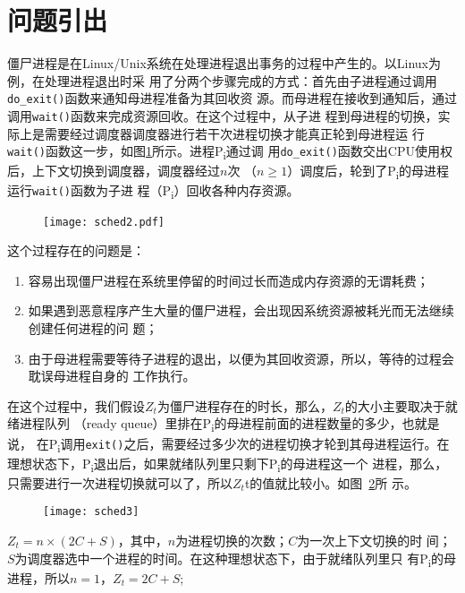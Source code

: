 \documentclass{swfuthesism}
\begin{document}
\section{问题引出}

僵尸进程是在Linux/Unix系统在处理进程退出事务的过程中产生的。以Linux为例，在处理进程退出时采
用了分两个步骤完成的方式：首先由子进程通过调用\texttt{do\_exit()}函数来通知母进程准备为其回收资
源。而母进程在接收到通知后，通过调用\texttt{wait()}函数来完成资源回收。在这个过程中，从子进
程到母进程的切换，实际上是需要经过调度器调度器进行若干次进程切换才能真正轮到母进程运
行\texttt{wait()}函数这一步，如图\ref{fig:sched2}所示。进程P\textsubscript{i}通过调
用\texttt{do\_exit()}函数交出CPU使用权后，上下文切换到调度器，调度器经过$n$次
（$n\ge 1$）调度后，轮到了P\textsubscript{i}的母进程运行\texttt{\texttt{wait()}}函数为子进
程（P\textsubscript{i}）回收各种内存资源。

\begin{figure}
  \centering
  \texttt{[image: sched2.pdf]}
  \label{fig:sched2}
\end{figure}

这个过程存在的问题是：
\begin{enumerate}
\item 容易出现僵尸进程在系统里停留的时间过长而造成内存资源的无谓耗费；
\item 如果遇到恶意程序产生大量的僵尸进程，会出现因系统资源被耗光而无法继续创建任何进程的问
  题；
\item 由于母进程需要等待子进程的退出，以便为其回收资源，所以，等待的过程会耽误母进程自身的
  工作执行。
\end{enumerate}

在这个过程中，我们假设$Z_t$为僵尸进程存在的时长，那么，$Z_t$的大小主要取决于就绪进程队列
（ready queue）里排在P\textsubscript{i}的母进程前面的进程数量的多少，也就是说，
在P\textsubscript{i}调用\texttt{exit()}之后，需要经过多少次的进程切换才轮到其母进程运行。在
理想状态下，P\textsubscript{i}退出后，如果就绪队列里只剩下P\textsubscript{i}的母进程这一个
进程，那么，只需要进行一次进程切换就可以了，所以$Z_t$t的值就比较小。如图~\ref{fig:sched3}所
示。

\begin{figure}[ht]
  \centering
  \texttt{[image: sched3]}
  \label{fig:sched3}
\end{figure}

$Z_t=n\times{}(2C+S)$，其中，$n$为进程切换的次数；$C$为一次上下文切换的时
间； $S$为调度器选中一个进程的时间。在这种理想状态下，由于就绪队列里只
有P\textsubscript{i}的母进程，所以$n=1$，$Z_t=2C+S$;
\end{document}
